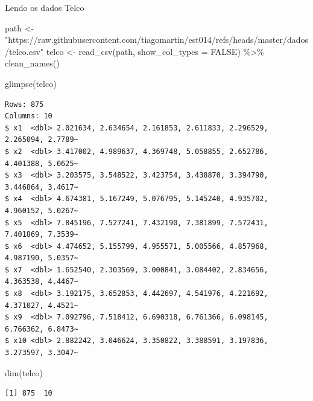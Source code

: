 \documentclass[
  ignorenonframetext,
  aspectratio=169,
]{beamer}
\newenvironment{Shaded}{\begin{snugshade}}{\end{snugshade}}
\newcommand{\AttributeTok}[1]{\textcolor[rgb]{0.40,0.45,0.13}{#1}}
\newcommand{\ConstantTok}[1]{\textcolor[rgb]{0.56,0.35,0.01}{#1}}
\newcommand{\FunctionTok}[1]{\textcolor[rgb]{0.28,0.35,0.67}{#1}}
\newcommand{\NormalTok}[1]{\textcolor[rgb]{0.00,0.23,0.31}{#1}}
\newcommand{\OtherTok}[1]{\textcolor[rgb]{0.00,0.23,0.31}{#1}}
\newcommand{\SpecialCharTok}[1]{\textcolor[rgb]{0.37,0.37,0.37}{#1}}
\newcommand{\StringTok}[1]{\textcolor[rgb]{0.13,0.47,0.30}{#1}}
\begin{document}
\begin{frame}[fragile]{Lendo os dados Telco}
\label{lendo-os-dados-telco}
\begin{Shaded}
\begin{Highlighting}[]
\NormalTok{path }\OtherTok{\textless{}{-}} \StringTok{"https://raw.githubusercontent.com/tiagomartin/est014/refs/heads/master/dados/telco.csv"}
\NormalTok{telco }\OtherTok{\textless{}{-}} \FunctionTok{read\_csv}\NormalTok{(path, }\AttributeTok{show\_col\_types =} \ConstantTok{FALSE}\NormalTok{) }\SpecialCharTok{\%\textgreater{}\%}
  \FunctionTok{clean\_names}\NormalTok{() }

\FunctionTok{glimpse}\NormalTok{(telco)}
\end{Highlighting}
\end{Shaded}

\begin{verbatim}
Rows: 875
Columns: 10
$ x1  <dbl> 2.021634, 2.634654, 2.161853, 2.611833, 2.296529, 2.265094, 2.7789~
$ x2  <dbl> 3.417002, 4.989637, 4.369748, 5.058855, 2.652786, 4.401388, 5.0625~
$ x3  <dbl> 3.203575, 3.548522, 3.423754, 3.438870, 3.394790, 3.446864, 3.4617~
$ x4  <dbl> 4.674381, 5.167249, 5.076795, 5.145240, 4.935702, 4.960152, 5.0267~
$ x5  <dbl> 7.845196, 7.527241, 7.432190, 7.381899, 7.572431, 7.401869, 7.3539~
$ x6  <dbl> 4.474652, 5.155799, 4.955571, 5.005566, 4.857968, 4.987190, 5.0357~
$ x7  <dbl> 1.652540, 2.303569, 3.000841, 3.084402, 2.834656, 4.363538, 4.4467~
$ x8  <dbl> 3.192175, 3.652853, 4.442697, 4.541976, 4.221692, 4.371027, 4.4521~
$ x9  <dbl> 7.092796, 7.518412, 6.690318, 6.761366, 6.098145, 6.766362, 6.8473~
$ x10 <dbl> 2.882242, 3.046624, 3.350822, 3.388591, 3.197836, 3.273597, 3.3047~
\end{verbatim}

\begin{Shaded}
\begin{Highlighting}[]
\FunctionTok{dim}\NormalTok{(telco)}
\end{Highlighting}
\end{Shaded}

\begin{verbatim}
[1] 875  10
\end{verbatim}
\end{frame}
\end{document}
